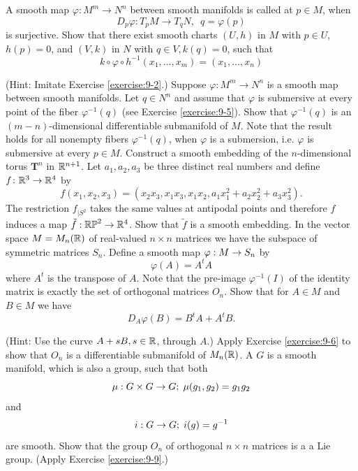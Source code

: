 \begin{enumerate}[\theexercise.1]
  \NewItem A smooth map $\varphi:M^m\to N^n$ between smooth manifolds is called 
    at $p\in M$, when
    \[
      D_p\varphi:T_pM\to T_qN, \enspace q = \varphi(p)
    \]
    is surjective. Show that there exist smooth charts $(U, h)$ in $M$ with $p\in U$,
    $h(p) = 0$, and $(V, k)$ in $N$ with $q\in V, k(q) = 0$, such that
    \[
      k\circ\varphi\circ h^{-1}(x_1, \ldots, x_m) = (x_1, \ldots, x_n)
    \]
    \par(Hint: Imitate Exercise \ref{exercise:9-2}.)
  \NewItem Suppose $\varphi:M^m\to N^n$ is a smooth map between smooth manifolds. Let
    $q\in N^n$ and assume that $\varphi$ is submersive at every point of the fiber
    $\varphi^{-1}(q)$ (see Exercise \ref{exercise:9-5}). Show that $\varphi^{-1}(q)$ is an $(m- n)$-dimensional
    differentiable submanifold of $M$. Note that the result holds for all nonempty fibers $\varphi^{-1}(q)$, when $\varphi$
    is a submersion, i.e. $\varphi$ is submersive at every $p\in M$.
  \NewItem Construct a smooth embedding of the $n$-dimensional torus ${\mathbf{T}}^{n}$ in ${\mathbb{R}}^{n + 1}$.
  \NewItem Let ${a}_{1},{a}_{2},{a}_{3}$ be three distinct real numbers and define $f\colon {\ensuremath{\mathbb{R}}}^{3} \rightarrow  {\ensuremath{\mathbb{R}}}^{4}$ by
    \[
      f( {{x}_{1},{x}_{2},{x}_{3}})  = ( {{x}_{2}{x}_{3},{x}_{1}{x}_{3},{x}_{1}{x}_{2},{a}_{1}{x}_{1}^{2} + {a}_{2}{x}_{2}^{2} + {a}_{3}{x}_{3}^{2}}).
    \]
    The restriction ${f}_{\mid {S}^{2}}$ takes the same values at antipodal points and therefore $f$ induces a map $\tilde{f} : {\mathbb{{RP}}}^{2} \rightarrow  {\ensuremath{\mathbb{R}}}^{4}$. Show that $\tilde{f}$ is a smooth embedding.
  \NewItem In the vector space $M = {M}_{n}( \mathbb{R})$ of real-valued $n \times  n$ matrices we have the subspace of symmetric matrices ${S}_{n}$. Define a smooth map $\varphi  : M \rightarrow  {S}_{n}$ by
    \[
      \varphi ( A)  = {A}^{t}A
    \]
    where ${A}^{t}$ is the transpose of $A$. Note that the pre-image ${\varphi }^{-1}( I)$ of the identity matrix is exactly the set of orthogonal matrices ${O}_{n}$. Show that for $A \in  M$ and $B \in  M$ we have
    \[
      {D}_{A}\varphi ( B)  = {B}^{t}A + {A}^{t}B.
    \]
    \par(Hint: Use the curve $A + {sB},s \in  \mathbb{R}$, through $A$.)
    Apply Exercise \ref{exercise:9-6} to show that ${O}_{n}$ is a differentiable submanifold of ${M}_{n}( \mathbb{R})$.
  \NewItem A  $G$ is a smooth manifold, which is also a group, such that both
    \[
      \mu  : G \times  G \rightarrow  G;\;\mu ( {{g}_{1},{g}_{2}})  = {g}_{1}{g}_{2}
    \]
    and
    \[
      i : G \rightarrow  G;\;i( g)  = {g}^{-1}
    \]
    are smooth. Show that the group ${O}_{n}$ of orthogonal $n \times  n$ matrices is a a Lie group. (Apply Exercise \ref{exercise:9-9}.)

\end{enumerate}
